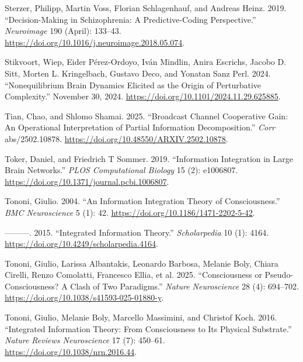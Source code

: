 \documentclass[
  a4paper]{article}
\newlength{\cslhangindent}
\newenvironment{CSLReferences}[2] %
 {\begin{list}{}{%
  \setlength{\itemindent}{0pt}
  \setlength{\leftmargin}{0pt}
  \setlength{\parsep}{0pt}
  \ifodd #1
   \setlength{\leftmargin}{\cslhangindent}
   \setlength{\itemindent}{-1\cslhangindent}
  \fi
  \setlength{\itemsep}{#2\baselineskip}}}
 {\end{list}}
\begin{document}
\begin{CSLReferences}{1}{0}
Sterzer, Philipp, Martin Voss, Florian Schlagenhauf, and Andreas Heinz.
2019. {``Decision-Making in Schizophrenia: A Predictive-Coding
Perspective.''} \emph{Neuroimage} 190 (April): 133--43.
\url{https://doi.org/10.1016/j.neuroimage.2018.05.074}.

Stikvoort, Wiep, Eider Pérez-Ordoyo, Iván Mindlin, Anira Escrichs,
Jacobo D. Sitt, Morten L. Kringelbach, Gustavo Deco, and Yonatan Sanz
Perl. 2024. {``Nonequilibrium Brain Dynamics Elicited as the Origin of
Perturbative Complexity.''} November 30, 2024.
\url{https://doi.org/10.1101/2024.11.29.625885}.

Tian, Chao, and Shlomo Shamai. 2025. {``Broadcast Channel Cooperative
Gain: An Operational Interpretation of Partial Information
Decomposition.''} \emph{Corr} abs/2502.10878.
\url{https://doi.org/10.48550/ARXIV.2502.10878}.

Toker, Daniel, and Friedrich T Sommer. 2019. {``Information Integration
in Large Brain Networks.''} \emph{PLOS Computational Biology} 15 (2):
e1006807. \url{https://doi.org/10.1371/journal.pcbi.1006807}.

Tononi, Giulio. 2004. {``An Information Integration Theory of
Consciousness.''} \emph{BMC Neuroscience} 5 (1): 42.
\url{https://doi.org/10.1186/1471-2202-5-42}.

---------. 2015. {``Integrated Information Theory.''}
\emph{Scholarpedia} 10 (1): 4164.
\url{https://doi.org/10.4249/scholarpedia.4164}.

Tononi, Giulio, Larissa Albantakis, Leonardo Barbosa, Melanie Boly,
Chiara Cirelli, Renzo Comolatti, Francesco Ellia, et al. 2025.
{``Consciousness or Pseudo-Consciousness? {A} Clash of Two Paradigms.''}
\emph{Nature Neuroscience} 28 (4): 694--702.
\url{https://doi.org/10.1038/s41593-025-01880-y}.

Tononi, Giulio, Melanie Boly, Marcello Massimini, and Christof Koch.
2016. {``Integrated Information Theory: From Consciousness to Its
Physical Substrate.''} \emph{Nature Reviews Neuroscience} 17 (7):
450--61. \url{https://doi.org/10.1038/nrn.2016.44}.


\end{CSLReferences}
\end{document}
